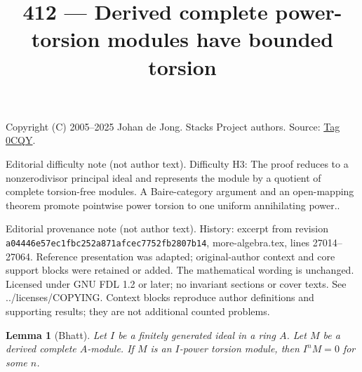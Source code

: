 \documentclass{amsart}
\theoremstyle{plain}
\newtheorem{lemma}[subsection]{Lemma}
\theoremstyle{definition}
\theoremstyle{remark}
\numberwithin{equation}{subsection}
\begin{document}
\title[Stacks Project, Tag 0CQY]{412 --- Derived complete power-torsion modules have bounded torsion}
\maketitle
\noindent Copyright (C) 2005--2025 Johan de Jong. Stacks Project authors. Source: \href{https://stacks.math.columbia.edu/tag/0CQY}{Tag 0CQY}.

\noindent Editorial difficulty note (not author text). Difficulty H3: The proof reduces to a nonzerodivisor principal ideal and represents the module by a quotient of complete torsion-free modules. A Baire-category argument and an open-mapping theorem promote pointwise power torsion to one uniform annihilating power..

\noindent Editorial provenance note (not author text). History: excerpt from revision \texttt{a0444\allowbreak 6e57e\allowbreak c1fbc\allowbreak 252a8\allowbreak 71afc\allowbreak ec775\allowbreak 2fb28\allowbreak 07b14}, more-algebra.tex, lines 27014--27064. Reference presentation was adapted; original-author context and core support blocks were retained or added. The mathematical wording is unchanged. Licensed under GNU FDL 1.2 or later; no invariant sections or cover texts. See ../licenses/COPYING. Context blocks reproduce author definitions and supporting results; they are not additional counted problems.

\begin{lemma}[Bhatt]
\label{lemma-torsion-and-derived-complete}
Let $I$ be a finitely generated ideal in a ring $A$.
Let $M$ be a derived complete $A$-module. If $M$ is
an $I$-power torsion module, then $I^nM = 0$ for some $n$.
\end{lemma}
\end{document}
